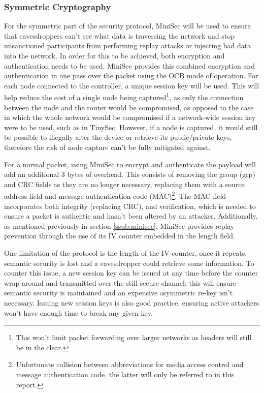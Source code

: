 \documentclass{mprop}
\begin{document}
\subsubsection{Symmetric Cryptography} %
\label{ssub:symmetric_key_cryptography}
For the symmetric part of the security protocol, MiniSec\cite{MiniSec} will be used to ensure that eavesdroppers can't see what data is traversing the network and stop unsanctioned participants from performing replay attacks or injecting bad data into the network. In order for this to be achieved, both encryption and authentication needs to be used. MiniSec provides this combined encryption and authentication in one pass over the packet using the OCB mode of operation. For each node connected to the controller, a unique session key will be used. This will help reduce the cost of a single node being captured\footnote{This won't limit packet forwarding over larger networks as headers will still be in the clear.}, as only the connection between the node and the router would be compromised, as opposed to the case in which the whole network would be compromised if a network-wide session key were to be used, such as in TinySec\cite{TinySec}. However, if a node is captured, it would still be possible to illegally alter the device or retrieve its public/private keys, therefore the risk of node capture can't be fully mitigated against.

For a normal packet, using MiniSec to encrypt and authenticate the payload will add an additional 3 bytes of overhead. This consists of removing the group (grp) and CRC fields as they are no longer necessary, replacing them with a source address field and message authentication code (MAC)\footnote{Unfortunate collision between abbreviations for media access control and message authentication code, the latter will only be referred to in this report.}. The MAC field incorporates both integrity (replacing CRC), and verification, which is needed to ensure a packet is authentic and hasn't been altered by an attacker. Additionally, as mentioned previously in section \ref{ssub:minisec}, MiniSec provides replay prevention through the use of its IV counter embedded in the length field.

One limitation of the protocol is the length of the IV counter, once it repeats, semantic security is lost and a eavesdropper could retrieve some information. To counter this issue, a new session key can be issued at any time before the counter wrap-around and transmitted over the still secure channel; this will ensure semantic security is maintained and an expensive asymmetric re-key isn't necessary. Issuing new session keys is also good practice, ensuring active attackers won't have enough time to break any given key.
\end{document}
